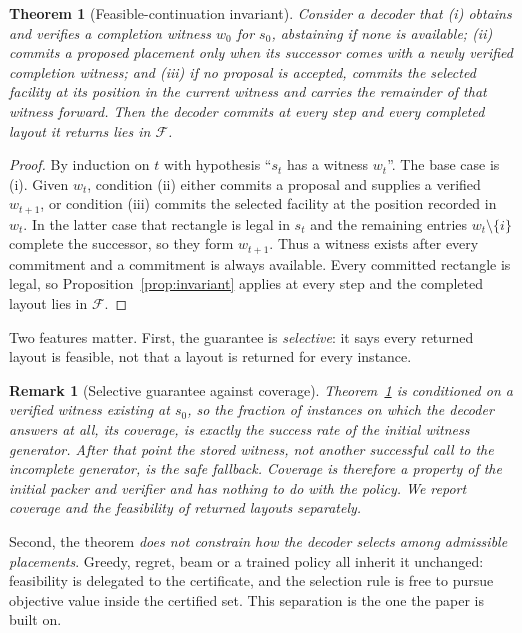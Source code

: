 \documentclass[preprint,12pt,authoryear]{elsarticle}
\newtheorem{thm}{Theorem}
\newtheorem{rem}{Remark}
\newcommand{\cF}{\mathcal{F}}
\begin{document}
\begin{thm}[Feasible-continuation invariant]
\label{thm:certified}
Consider a decoder that (i) obtains and verifies a completion witness $w_0$ for
$s_0$, abstaining if none is available; (ii) commits a proposed placement only
when its successor comes with a newly verified completion witness; and (iii) if
no proposal is accepted, commits the selected facility at its position in the
current witness and carries the remainder of that witness forward. Then the
decoder commits at every step and every completed layout it returns lies in
$\cF$.
\end{thm}
\begin{proof}
By induction on $t$ with hypothesis ``$s_t$ has a witness $w_t$''. The base case
is (i). Given $w_t$, condition (ii) either commits a proposal and supplies a
verified $w_{t+1}$, or condition (iii) commits the selected facility at the
position recorded in $w_t$. In the latter case that rectangle is legal in $s_t$
and the remaining entries $w_t\setminus\{i\}$ complete the successor, so they
form $w_{t+1}$. Thus a witness exists after every commitment and a commitment is
always available. Every committed rectangle is legal, so
Proposition~\ref{prop:invariant} applies at every step and the completed layout
lies in $\cF$.
\end{proof}

Two features matter. First, the guarantee is \emph{selective}: it says every
returned layout is feasible, not that a layout is returned for every instance.

\begin{rem}[Selective guarantee against coverage]
\label{rem:coverage}
Theorem~\ref{thm:certified} is conditioned on a verified witness existing at
$s_0$, so the fraction of instances on which the decoder answers at all, its
\emph{coverage}, is exactly the success rate of the initial witness generator.
After that point the stored witness, not another successful call to the
incomplete generator, is the safe fallback. Coverage is therefore a property of
the initial packer and verifier and has nothing to do with the policy. We report
coverage and the feasibility of returned layouts separately.
\end{rem}

Second, the theorem
\emph{does not constrain how the decoder selects among admissible placements}.
Greedy, regret, beam or a trained policy all inherit it unchanged: feasibility is
delegated to the certificate, and the selection rule is free to pursue objective
value inside the certified set. This separation is the one the paper is built
on.
\end{document}
